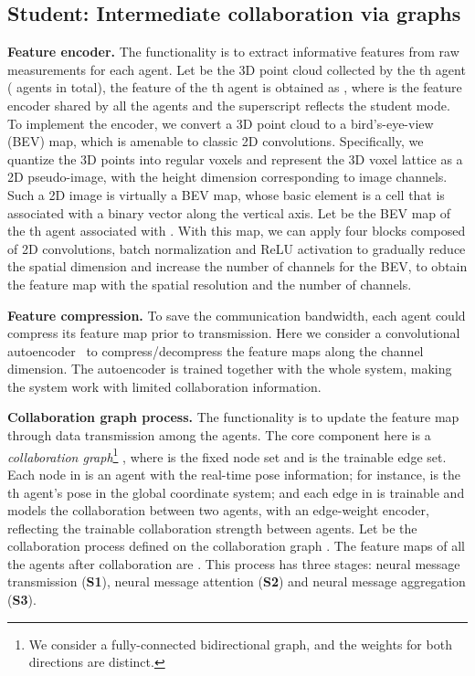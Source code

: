 \documentclass{article}
\newcommand{\mypar}[1]{{\bf #1.}}
\begin{document}
\vspace{-2mm}
\subsection{Student: Intermediate collaboration via graphs}
\vspace{-2mm}
\label{sec:student}
\mypar{Feature encoder} The functionality is to extract informative features from raw measurements for each agent. Let   be the 3D point cloud collected by the th agent ( agents in total), the feature of the th agent is obtained as , where  is the feature encoder shared by all the agents and the superscript  reflects the student mode. To implement the encoder, we convert a 3D
point cloud to a bird's-eye-view (BEV) map, which is amenable to classic 2D convolutions. Specifically, we quantize the 3D points into regular voxels and represent the 3D voxel lattice as a 2D pseudo-image, with the height dimension corresponding to image channels. Such a 2D image is virtually a BEV map, whose basic element is a cell that is associated with a binary vector along the vertical axis.  Let  be the  BEV map of the th agent associated with . With this map, we can apply four blocks composed of 2D convolutions, batch normalization and ReLU activation to gradually reduce the spatial dimension and increase the number of channels for the BEV, to obtain the feature map  with  the spatial resolution and  the number of channels.

\mypar{Feature compression} To save the communication bandwidth, each agent could compress its feature map prior to transmission. Here we consider a  convolutional autoencoder~\cite{masci2011stacked} to compress/decompress the feature maps along the channel dimension. The autoencoder is trained together with the whole system, making the system work with limited collaboration information. 

\mypar{Collaboration graph process}
The functionality is to update the feature map through data transmission among the agents. The core component here is a \textit{collaboration graph}\footnote[1]{We consider a fully-connected bidirectional graph, and the weights for both directions are distinct.} , where   is the fixed node set and  is the trainable edge set. Each node in  is an agent with the real-time pose information; for instance,  is  the th agent's pose in the global coordinate system; and each edge in  is trainable and models the collaboration between two agents, with  an edge-weight encoder, reflecting the trainable collaboration strength between agents. Let  be the collaboration process defined on the collaboration graph . The feature maps of all the agents after collaboration are .  This process has three stages: neural message transmission (\textbf{S1}), neural message attention (\textbf{S2}) and neural message aggregation (\textbf{S3}).
\end{document}

